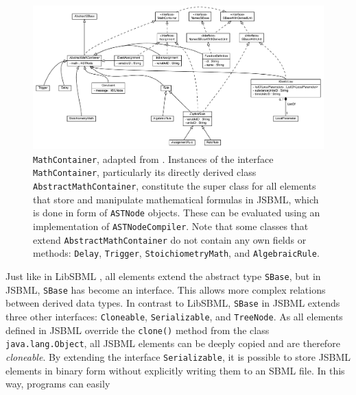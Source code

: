 \documentclass[
  BCOR12mm,
  letterpaper,
  11pt,
  headsepline,
  pointlessnumbers,
  tablecaptionabove,
  onelinecaption,
  headinclude,
  appendixprefix,
  idxtotoc,
  bibtotoc,
  twoside,
  titlepage
]{scrartcl}
\begin{document}
\begin{figure}[htb]
 \centering
 \includegraphics[width=\textwidth]{img/MathContainer}
 \caption[\texttt{MathContainer}]{\texttt{MathContainer}, adapted from \citep{Draeger2011}. Instances of the interface \texttt{MathContainer}, particularly its directly derived class \texttt{AbstractMathContainer}, constitute the super class for all elements that store and manipulate mathematical formulas in JSBML, which is done in form of \texttt{ASTNode} objects. These can be evaluated using an implementation of \texttt{ASTNodeCompiler}. Note that some classes that extend \texttt{AbstractMathContainer} do not contain any own fields or methods: \texttt{Delay}, \texttt{Trigger}, \texttt{StoichiometryMath}, and \texttt{AlgebraicRule}.}
 \label{fig:MathContainerHierarchy}
\end{figure}
Just like in LibSBML \citep{Bornstein2008}, all elements extend the abstract type \texttt{SBase}, but in
JSBML, \texttt{SBase} has become an interface. This allows more complex relations
between derived data types. In contrast to LibSBML, \texttt{SBase} in JSBML
extends three other interfaces: \texttt{Cloneable}, \texttt{Serializable},
and \texttt{TreeNode}. As all elements defined in JSBML override the \texttt{clone()}
method from the class \texttt{java.lang.Object}, all JSBML elements can be deeply
copied and are therefore \emph{cloneable}. By extending the interface
\texttt{Serializable},
it is possible to store JSBML elements in binary form
without explicitly writing them to an SBML file. In this way, programs can easily
\end{document}
